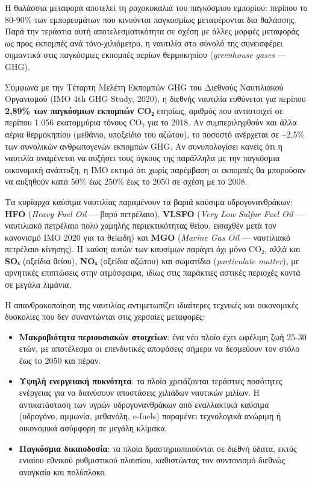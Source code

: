 Η θαλάσσια μεταφορά αποτελεί τη ραχοκοκαλιά του παγκόσμιου εμπορίου:
περίπου το 80-90\% των εμπορευμάτων που κινούνται παγκοσμίως
μεταφέρονται δια θαλάσσης. Παρά την τεράστια αυτή αποτελεσματικότητα σε
σχέση με άλλες μορφές μεταφοράς ως προς εκπομπές ανά τόνο-χιλιόμετρο, η
ναυτιλία στο σύνολό της συνεισφέρει σημαντικά στις παγκόσμιες εκπομπές
αερίων θερμοκηπίου (\emph{greenhouse gases} --- GHG).

Σύμφωνα με την Τέταρτη Μελέτη Εκπομπών GHG του Διεθνούς Ναυτιλιακού
Οργανισμού (IMO 4th GHG Study, 2020), η διεθνής ναυτιλία ευθύνεται για
περίπου \textbf{2,89\% των παγκόσμιων εκπομπών CO₂} ετησίως, αριθμός που
αντιστοιχεί σε περίπου 1.056 εκατομμύρια τόνους CO₂ για το 2018. Αν
συμπεριληφθούν και άλλα αέρια θερμοκηπίου (μεθάνιο, υποξείδιο του
αζώτου), το ποσοστό ανέρχεται σε \textasciitilde2,5\% των συνολικών
ανθρωπογενών εκπομπών GHG. Αν συνυπολογίσει κανείς ότι η ναυτιλία
αναμένεται να αυξήσει τους όγκους της παράλληλα με την παγκόσμια
οικονομική ανάπτυξη, η IMO εκτιμά ότι χωρίς παρέμβαση οι εκπομπές θα
μπορούσαν να αυξηθούν κατά 50\% έως 250\% έως το 2050 σε σχέση με το
2008.

Τα κυρίαρχα καύσιμα ναυτιλίας παραμένουν τα βαριά καύσιμα
υδρογονανθράκων: \textbf{HFO} (\emph{Heavy Fuel Oil} --- βαρύ
πετρέλαιο), \textbf{VLSFO} (\emph{Very Low Sulfur Fuel Oil} ---
ναυτιλιακό πετρέλαιο πολύ χαμηλής περιεκτικότητας θείου, εισαχθέν μετά
τον κανονισμό IMO 2020 για τα θείωδη) και \textbf{MGO} (\emph{Marine Gas
Oil} --- ναυτιλιακό πετρέλαιο κίνησης). Η καύση αυτών των καυσίμων
παράγει όχι μόνο CO₂, αλλά και \textbf{SOₓ} (οξείδια θείου),
\textbf{NOₓ} (οξείδια αζώτου) και σωματίδια (\emph{particulate matter}),
με αρνητικές επιπτώσεις στην ατμόσφαιρα, ιδίως στις παράκτιες αστικές
περιοχές κοντά σε μεγάλα λιμάνια.

Η απανθρακοποίηση της ναυτιλίας αντιμετωπίζει ιδιαίτερες τεχνικές και
οικονομικές δυσκολίες που δεν συναντώνται στις χερσαίες μεταφορές:

\begin{itemize}
\tightlist
\item
  \textbf{Μακροβιότητα περιουσιακών στοιχείων}: ένα νέο πλοίο έχει
  ωφέλιμη ζωή 25-30 ετών, με αποτέλεσμα οι επενδυτικές αποφάσεις σήμερα
  να δεσμεύουν τον στόλο έως το 2050 και πέραν.
\item
  \textbf{Υψηλή ενεργειακή πυκνότητα}: τα πλοία χρειάζονται τεράστιες
  ποσότητες ενέργειας για να διανύσουν αποστάσεις χιλιάδων ναυτικών
  μιλίων. Η αντικατάσταση των υγρών υδρογονανθράκων από εναλλακτικά
  καύσιμα (υδρογόνο, αμμωνία, μεθανόλη, e-fuels) παραμένει τεχνολογικά
  ανώριμη ή οικονομικά ασύμφορη σε μεγάλη κλίμακα.
\item
  \textbf{Παγκόσμια δικαιοδοσία}: τα πλοία δραστηριοποιούνται σε διεθνή
  ύδατα, εκτός ενιαίου εθνικού ρυθμιστικού πλαισίου, καθιστώντας τον
  συντονισμό διεθνώς αναγκαίο και πολύπλοκο.
\end{itemize}

